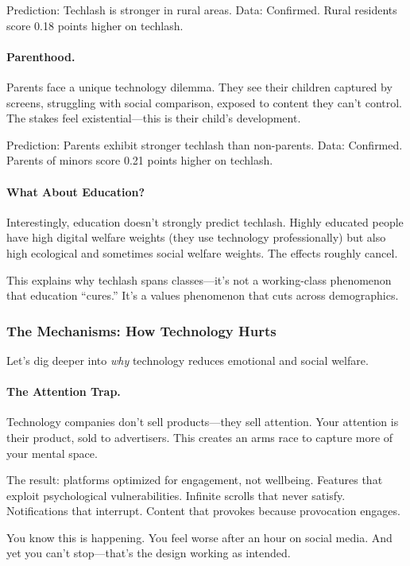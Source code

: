 Prediction: Techlash is stronger in rural areas.
Data: Confirmed. Rural residents score 0.18 points higher on techlash.

\paragraph{Parenthood.}
Parents face a unique technology dilemma. They see their children captured 
by screens, struggling with social comparison, exposed to content they 
can't control. The stakes feel existential---this is their child's development.

Prediction: Parents exhibit stronger techlash than non-parents.
Data: Confirmed. Parents of minors score 0.21 points higher on techlash.

\paragraph{What About Education?}
Interestingly, education doesn't strongly predict techlash. Highly educated 
people have high digital welfare weights (they use technology professionally) 
but also high ecological and sometimes social welfare weights. The effects 
roughly cancel.

This explains why techlash spans classes---it's not a working-class phenomenon 
that education ``cures.'' It's a values phenomenon that cuts across demographics.

\subsubsection{The Mechanisms: How Technology Hurts}

Let's dig deeper into \emph{why} technology reduces emotional and social welfare.

\paragraph{The Attention Trap.}

Technology companies don't sell products---they sell attention. Your attention 
is their product, sold to advertisers. This creates an arms race to capture 
more of your mental space.

The result: platforms optimized for engagement, not wellbeing. Features 
that exploit psychological vulnerabilities. Infinite scrolls that never 
satisfy. Notifications that interrupt. Content that provokes because 
provocation engages.

You know this is happening. You feel worse after an hour on social media. 
And yet you can't stop---that's the design working as intended.


